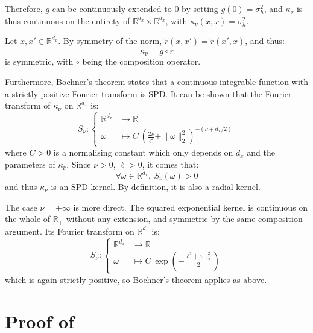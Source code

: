 Therefore, $g$ can be continuously extended to $0$ by setting $g(0)=\sigma_h^2$, and $\kappa_\nu$ is thus continuous on the entirety of $\mathbb{R}^{d_x}\times\mathbb{R}^{d_x}$, with $\kappa_\nu(x,x)=\sigma_h^2$.

Let $x,x'\in\mathbb{R}^{d_x}$. By symmetry of the norm, $\tilde{r}(x,x')=\tilde{r}(x',x)$, and thus:
\begin{equation}
	\kappa_\nu=g\circ\tilde{r}
\end{equation}
is symmetric, with $\circ$ being the composition operator.

Furthermore, Bochner's theorem \cite{bib:Akhiezer} states that a continuous integrable function with a strictly positive Fourier transform is SPD. It can be shown \cite{bib:Matérn-correlation} that the Fourier transform of $\kappa_\nu$ on $\mathbb{R}^{d_x}$ is:
\begin{equation}
	S_\nu:\left\{\begin{aligned}
	\mathbb{R}^{d_x}&\to\mathbb{R}\\
	\omega&\mapsto C\:\left(\frac{2\nu}{\ell^2}+\|\omega\|_2^2\right)^{-(\nu+d_x/2)}
	\end{aligned}\right.
\end{equation}
where $C>0$ is a normalising constant which only depends on $d_x$ and the parameters of $\kappa_\nu$. Since $\nu>0$, $\ell>0$, it comes that:
\begin{equation}
	\forall\omega\in\mathbb{R}^{d_x},\:S_\nu(\omega)>0
\end{equation}
and thus $\kappa_\nu$ is an SPD kernel. By definition, it is also a radial kernel.

The case $\nu=+\infty$ is more direct. The squared exponential kernel is continuous on the whole of $\mathbb{R}_+$ without any extension, and symmetric by the same composition argument. Its Fourier transform on $\mathbb{R}^{d_x}$ is:
\begin{equation}
	S_\nu:\left\{\begin{aligned}
	\mathbb{R}^{d_x}&\to\mathbb{R}\\
	\omega&\mapsto C\:\exp\left(-\frac{\ell^2\|\omega\|_2^2}{2}\right)
	\end{aligned}\right.
\end{equation}
which is again strictly positive, so Bochner's theorem applies as above.

\section[Proof of Proposition 3.8]{Proof of }\label{sec:proof_OK}

